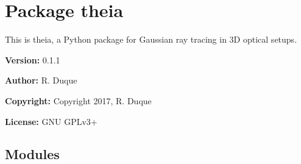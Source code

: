 %
%
%


\section{Package theia}

    \label{theia}
This is theia, a Python package for Gaussian ray tracing in 3D optical 
setups.

\textbf{Version:} 0.1.1



\textbf{Author:} R. Duque



\textbf{Copyright:} Copyright 2017, R. Duque



\textbf{License:} GNU GPLv3+





\subsection{Modules}

